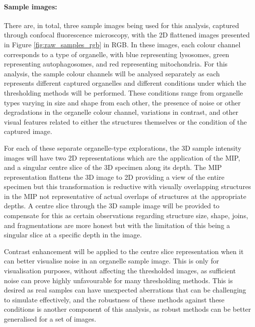 \paragraph{Sample images:} There are, in total, three sample images being used for this analysis, captured through confocal fluorescence microscopy, with the 2D flattened images presented in Figure \ref{fig:raw_samples_rgb} in RGB. In these images, each colour channel corresponds to a type of organelle, with blue representing lysosomes, green representing autophagosomes, and red representing mitochondria. For this analysis, the sample colour channels will be analysed separately as each represents different captured organelles and different conditions under which the thresholding methods will be performed. These conditions range from organelle types varying in size and shape from each other, the presence of noise or other degradations in the organelle colour channel, variations in contrast, and other visual features related to either the structures themselves or the condition of the captured image.\par For each of these separate organelle-type explorations, the 3D sample intensity images will have two 2D representations which are the application of the MIP, and a singular centre slice of the 3D specimen along its depth. The MIP representation flattens the 3D image to 2D providing a view of the entire specimen but this transformation is reductive with visually overlapping structures in the MIP not representative of actual overlaps of structures at the appropriate depths. A centre slice through the 3D sample image will be provided to compensate for this as certain observations regarding structure size, shape, joins, and fragmentations are more honest but with the limitation of this being a singular slice at a specific depth in the image.\par Contrast enhancement will be applied to the centre slice representation when it can better visualise noise in an organelle sample image. This is only for visualisation purposes, without affecting the thresholded images, as sufficient noise can prove highly unfavourable for many thresholding methods. This is desired as real samples can have unexpected aberrations that can be challenging to simulate effectively, and the robustness of these methods against these conditions is another component of this analysis, as robust methods can be better generalised for a set of images.
